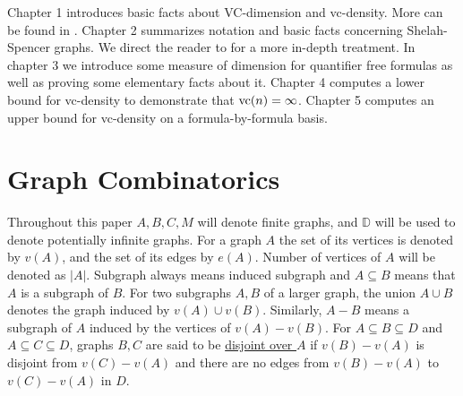 \documentclass{amsart}
\newcommand{\GG}{\mathbb G}
\newcommand{\defn}{\underline}
\newcommand{\DB}{\mathbb D}
\newcommand{\A}{A}
\newcommand{\B}{B}
\begin{document}
Chapter 1 introduces basic facts about VC-dimension and vc-density.
More can be found in \cite{density}.
Chapter 2 summarizes notation and basic facts concerning Shelah-Spencer graphs.
We direct the reader to \cite{laskowski} for a more in-depth treatment.
In chapter 3 we introduce some measure of dimension for quantifier free formulas as well as proving some elementary facts about it.
Chapter 4 computes a lower bound for vc-density to demonstrate that $\operatorname{vc}(n) = \infty$.
Chapter 5 computes an upper bound for vc-density on a formula-by-formula basis.




\section{Graph Combinatorics}

Throughout this paper $A, B, C, M$ will denote finite graphs, and $\DB$ will be used to denote potentially infinite graphs.
For a graph $\A$ the set of its vertices is denoted by $v(\A)$, and the set of its edges by $e(\A)$.
Number of vertices of $\A$ will be denoted as $|\A|$.
Subgraph always means induced subgraph and $A \subseteq B$ means that $A$ is a subgraph of $B$.
For two subgraphs $\A, \B$ of a larger graph, the union $\A \cup \B$ denotes the graph induced by $v(\A) \cup v(\B)$.
Similarly, $A - B$ means a subgraph of $A$ induced by the vertices of $v(A) - v(B)$.
For $A \subseteq B \subseteq D$ and $A \subseteq C \subseteq D$,
graphs $B,C$ are said to be \defn{disjoint over $A$} if $v(B) - v(A)$ is disjoint from $v(C) - v(A)$
and there are no edges from $v(B) - v(A)$ to $v(C) - v(A)$ in $D$.
\end{document}
